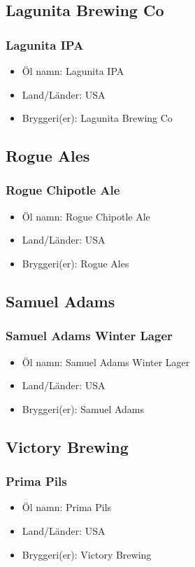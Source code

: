 \documentclass[11pt]{article}
\begin{document}
\subsection{Lagunita Brewing Co}
\label{sec:orgc2a42b6}
\subsubsection{Lagunita IPA}
\label{sec:org1312a6c}
\begin{itemize}
\item Öl namn: Lagunita IPA
\item Land/Länder: USA
\item Bryggeri(er): Lagunita Brewing Co
\end{itemize}
\subsection{Rogue Ales}
\label{sec:org41195b0}
\subsubsection{Rogue Chipotle Ale}
\label{sec:org93d87a1}
\begin{itemize}
\item Öl namn: Rogue Chipotle Ale
\item Land/Länder: USA
\item Bryggeri(er): Rogue Ales
\end{itemize}
\subsection{Samuel Adams}
\label{sec:orgbde0797}
\subsubsection{Samuel Adams Winter Lager}
\label{sec:org18873af}
\begin{itemize}
\item Öl namn: Samuel Adams Winter Lager
\item Land/Länder: USA
\item Bryggeri(er): Samuel Adams
\end{itemize}
\subsection{Victory Brewing}
\label{sec:org9eec101}
\subsubsection{Prima Pils}
\label{sec:orgb74b2c3}
\begin{itemize}
\item Öl namn: Prima Pils
\item Land/Länder: USA
\item Bryggeri(er): Victory Brewing
\end{itemize}
\end{document}
